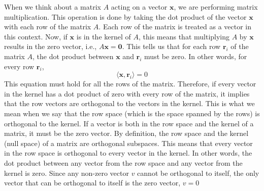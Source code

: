 \documentclass{report}
\begin{document}
\begin{itemize}
            \bigbreak \noindent 
            When we think about a matrix \( A \) acting on a vector \( \mathbf{x} \), we are performing matrix multiplication. This operation is done by taking the dot product of the vector \( \mathbf{x} \) with each row of the matrix \( A \). Each row of the matrix is treated as a vector in this context.
            Now, if \( \mathbf{x} \) is in the kernel of \( A \), this means that multiplying \( A \) by \( \mathbf{x} \) results in the zero vector, i.e., \( A\mathbf{x} = \mathbf{0} \). This tells us that for each row \( \mathbf{r}_i \) of the matrix \( A \), the dot product between \( \mathbf{x} \) and \( \mathbf{r}_i \) must be zero. In other words, for every row \( \mathbf{r}_i \),
            \[
                \langle \mathbf{x}, \mathbf{r}_i \rangle = 0
            \]
            This equation must hold for all the rows of the matrix. Therefore, if every vector in the kernel has a dot product of zero with every row of the matrix, it implies that the row vectors are orthogonal to the vectors in the kernel. This is what we mean when we say that the row space (which is the space spanned by the rows) is orthogonal to the kernel.
            \bigbreak \noindent 
            If a vector is both in the row space and the kernel of a matrix, it must be the zero vector.
            \bigbreak \noindent 
            By definition, the row space and the kernel (null space) of a matrix are orthogonal subspaces. This means that every vector in the row space is orthogonal to every vector in the kernel. In other words, the dot product between any vector from the row space and any vector from the kernel is zero.
            \bigbreak \noindent 
            Since any non-zero vector $v$ cannot be orthogonal to itself, the only vector that can be orthogonal to itself is the zero vector, $v=0$


\end{itemize}
\end{document}
